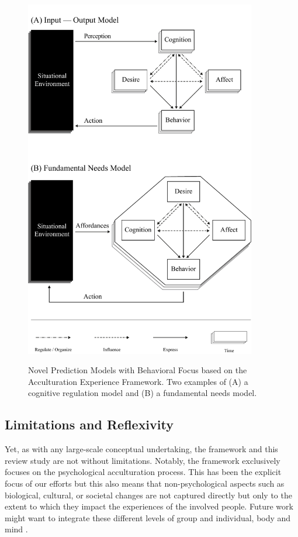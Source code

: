 \documentclass[man, 12pt, a4paper, mask]{apa7}
\begin{document}


\begin{figure}[ht!]
\centering
    \caption{Novel Prediction Models with Behavioral Focus based on the Acculturation Experience Framework. Two examples of (A) a cognitive regulation model and (B) a fundamental needs model.}
\includegraphics[width=0.9\textwidth]{Figures/NovelPredictionsBehaviorTime.pdf}
\label{fig:NovelModels}
\end{figure}

\subsection{Limitations and Reflexivity}
Yet, as with any large-scale conceptual undertaking, the framework and this review study are not without limitations. Notably, the framework exclusively focuses on the psychological acculturation process. This has been the explicit focus of our efforts but this also means that non-psychological aspects such as biological, cultural, or societal changes are not captured directly but only to the extent to which they impact the experiences of the involved people. Future work might want to integrate these different levels of group and individual, body and mind \citep[e.g.,][]{Eronen2021}. 
\end{document}
